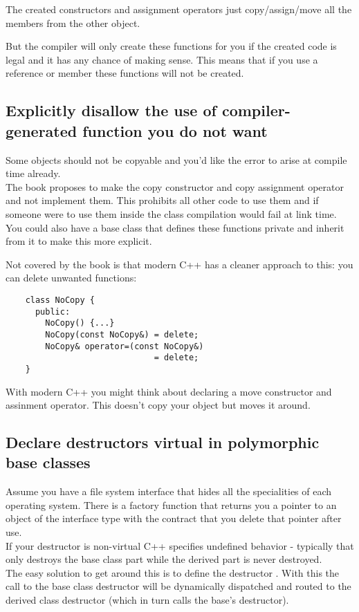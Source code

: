 \documentclass[a4paper, twocolumn]{article}
\let\oldsubsection\subsection
\newcounter{mysubsection}
\renewcommand{\subsection}{
    \stepcounter{mysubsection}
    \oldsubsection
}
\newcommand{\code}[1]{\texttt{\color{black}{#1}}}
\begin{document}
The created constructors and assignment operators just copy/assign/move all the members from the other object.

But the compiler will only create these functions for you if the created code is legal and it has any chance of making sense. This means that if you use a reference or \code{const} member these functions will not be created.

\subsection{Explicitly disallow the use of compiler-generated function you do not want} \label{ssec:DeleteCompilerFunctions}
Some objects should not be copyable and you'd like the error to arise at compile time already.\\
The book proposes to make the copy constructor and copy assignment operator \code{private} and not implement them. This prohibits all other code to use them and if someone were to use them inside the class compilation would fail at link time.\\
You could also have a base class that defines these functions private and inherit from it to make this more explicit.

Not covered by the book is that modern C++ has a cleaner approach to this: you can delete unwanted functions:
\begin{verbatim}
	class NoCopy {
	  public:
	    NoCopy() {...}
	    NoCopy(const NoCopy&) = delete;
	    NoCopy& operator=(const NoCopy&)
	                          = delete;
	}
\end{verbatim}
With modern C++ you might think about declaring a move constructor and assinment operator. This doesn't copy your object but moves it around.

\subsection{Declare destructors virtual in polymorphic base classes} \label{ssec:virtDtor}
Assume you have a file system interface that hides all the specialities of each operating system. There is a factory function that returns you a pointer to an object of the interface type with the contract that you delete that pointer after use.\\
If your destructor is non-virtual \code{delete} C++ specifies undefined behavior - typically that only destroys the base class part while the derived part is never destroyed.\\
The easy solution to get around this is to define the destructor \code{virtual}. With this the call to the base class destructor will be dynamically dispatched and routed to the derived class destructor (which in turn calls the base's destructor).
\end{document}
